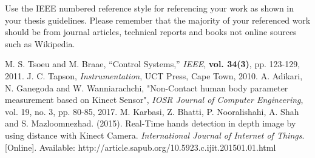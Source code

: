Use the IEEE numbered reference style for referencing your work as shown in your thesis guidelines.
Please remember that the majority of your referenced work should be from journal articles, technical
reports and books not online sources such as Wikipedia.

\begin{thebibliography}{5}
 M. S. Tsoeu and M. Braae, ``Control Systems,'' \emph{IEEE}, {\bf vol. 34(3)}, pp. 123-129, 2011.
 J. C. Tapson, \emph{Instrumentation}, UCT Press, Cape Town, 2010.
 A. Adikari, N. Ganegoda and W. Wanniarachchi, "Non-Contact human body parameter measurement based on Kinect Sensor", \emph{IOSR Journal of Computer Engineering}, vol. 19, no. 3, pp. 80-85, 2017. 
 M. Karbasi, Z. Bhatti, P. Nooralishahi, A. Shah and S. Mazloomnezhad. (2015). Real-Time hands detection in depth image by using distance with Kinect Camera. \emph{International Journal of Internet of Things}. [Online]. Available: http://article.sapub.org/10.5923.c.ijit.201501.01.html
\end{thebibliography}
